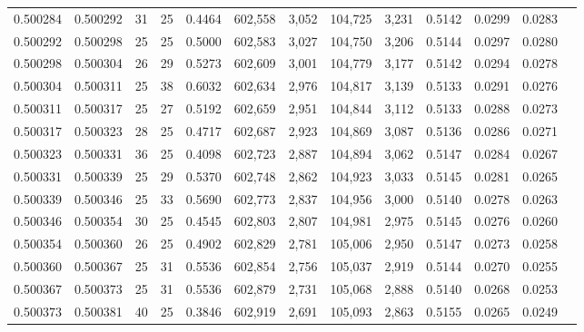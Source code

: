 \begin{tabular}{rrrrrrrrrrrrr}
0.500284 & 0.500292 &    31 &  25 &                                     0.4464 & 602,558 &   3,052 & 104,725 &   3,231 & 0.5142 & 0.0299 & 0.0283 \\
0.500292 & 0.500298 &    25 &  25 &                                     0.5000 & 602,583 &   3,027 & 104,750 &   3,206 & 0.5144 & 0.0297 & 0.0280 \\
0.500298 & 0.500304 &    26 &  29 &                                     0.5273 & 602,609 &   3,001 & 104,779 &   3,177 & 0.5142 & 0.0294 & 0.0278 \\
0.500304 & 0.500311 &    25 &  38 &                                     0.6032 & 602,634 &   2,976 & 104,817 &   3,139 & 0.5133 & 0.0291 & 0.0276 \\
0.500311 & 0.500317 &    25 &  27 &                                     0.5192 & 602,659 &   2,951 & 104,844 &   3,112 & 0.5133 & 0.0288 & 0.0273 \\
0.500317 & 0.500323 &    28 &  25 &                                     0.4717 & 602,687 &   2,923 & 104,869 &   3,087 & 0.5136 & 0.0286 & 0.0271 \\
0.500323 & 0.500331 &    36 &  25 &                                     0.4098 & 602,723 &   2,887 & 104,894 &   3,062 & 0.5147 & 0.0284 & 0.0267 \\
0.500331 & 0.500339 &    25 &  29 &                                     0.5370 & 602,748 &   2,862 & 104,923 &   3,033 & 0.5145 & 0.0281 & 0.0265 \\
0.500339 & 0.500346 &    25 &  33 &                                     0.5690 & 602,773 &   2,837 & 104,956 &   3,000 & 0.5140 & 0.0278 & 0.0263 \\
0.500346 & 0.500354 &    30 &  25 &                                     0.4545 & 602,803 &   2,807 & 104,981 &   2,975 & 0.5145 & 0.0276 & 0.0260 \\
0.500354 & 0.500360 &    26 &  25 &                                     0.4902 & 602,829 &   2,781 & 105,006 &   2,950 & 0.5147 & 0.0273 & 0.0258 \\
0.500360 & 0.500367 &    25 &  31 &                                     0.5536 & 602,854 &   2,756 & 105,037 &   2,919 & 0.5144 & 0.0270 & 0.0255 \\
0.500367 & 0.500373 &    25 &  31 &                                     0.5536 & 602,879 &   2,731 & 105,068 &   2,888 & 0.5140 & 0.0268 & 0.0253 \\
0.500373 & 0.500381 &    40 &  25 &                                     0.3846 & 602,919 &   2,691 & 105,093 &   2,863 & 0.5155 & 0.0265 & 0.0249 \\

\end{tabular}
